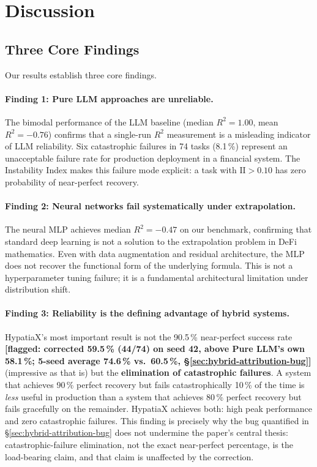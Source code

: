 \documentclass[twoside,11pt]{article}
\newcommand{\Rsq}{R^{2}}
\newcommand{\II}{\mathrm{II}}
\begin{document}
\section{Discussion}
\label{sec:discussion}

\subsection{Three Core Findings}\label{subsec:three-core-findings}
\label{sec:disc_findings}

Our results establish three core findings.

\paragraph{Finding 1: Pure LLM approaches are unreliable.}
The bimodal performance of the LLM baseline (median $\Rsq=1.00$, mean $\Rsq=-0.76$)
confirms that a single-run $\Rsq$ measurement is a misleading indicator of LLM
reliability.  Six catastrophic failures in 74 tasks (8.1\,\%) represent an
unacceptable failure rate for production deployment in a financial system.  The
Instability Index makes this failure mode explicit: a task with $\II>0.10$ has
zero probability of near-perfect recovery.

\paragraph{Finding 2: Neural networks fail systematically under extrapolation.}
The neural MLP achieves median $\Rsq=-0.47$ on our benchmark, confirming that
standard deep learning is not a solution to the extrapolation problem in DeFi
mathematics.  Even with data augmentation and residual architecture, the MLP does
not recover the functional form of the underlying formula.  This is not a
hyperparameter tuning failure; it is a fundamental architectural limitation under
distribution shift.

\paragraph{Finding 3: Reliability is the defining advantage of hybrid systems.}
HypatiaX's most important result is not the 90.5\,\% near-perfect success rate
\textbf{[flagged: corrected 59.5\,\% (44/74) on seed 42, above Pure LLM's
own 58.1\,\%; 5-seed average 74.6\,\% vs.\ 60.5\,\%,
\S\ref{sec:hybrid-attribution-bug}]}
(impressive as that is) but the \textbf{elimination of catastrophic failures}.
A system that achieves 90\,\% perfect recovery but fails catastrophically 10\,\%
of the time is \emph{less} useful in production than a system that achieves 80\,\%
perfect recovery but fails gracefully on the remainder.  HypatiaX achieves both:
high peak performance and zero catastrophic failures. This finding is precisely
why the bug quantified in \S\ref{sec:hybrid-attribution-bug} does not undermine
the paper's central thesis: catastrophic-failure elimination, not the exact
near-perfect percentage, is the load-bearing claim, and that claim is
unaffected by the correction.
\end{document}
